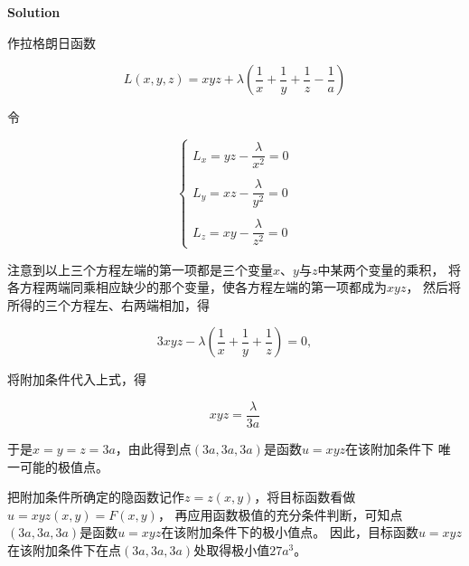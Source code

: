 \documentclass[12pt, a4paper]{article}
\numberwithin{equation}{section}
\begin{document}
    \textbf{Solution}
    \vspace{1em}

    作拉格朗日函数

    $$
        L(x, y, z)=x y z+\lambda\left(\frac{1}{x}+\frac{1}{y}+\frac{1}{z}-\frac{1}{a}\right)
    $$

    令

    $$
        \left\{\begin{array}{l}
            L_x=y z-\dfrac{\lambda}{x^2}=0 \\\\
            L_y=x z-\dfrac{\lambda}{y^2}=0 \\\\
            L_z=x y-\dfrac{\lambda}{z^2}=0
        \end{array}\right.
    $$

    注意到以上三个方程左端的第一项都是三个变量\(x\)、\(y \)与\(z\)中某两个变量的乘积，
    将各方程两端同乘相应缺少的那个变量，使各方程左端的第一项都成为\(xyz\)，
    然后将所得的三个方程左、右两端相加，得

    $$
        3 x y z-\lambda\left(\frac{1}{x}+\frac{1}{y}+\frac{1}{z}\right)=0,
    $$

    将附加条件代入上式，得

    $$
        x y z=\frac{\lambda}{3 a}
    $$

    于是\(x=y=z=3a\)，由此得到点\(\left(3a,3a,3a\right)\)是函数\(u=xyz\)在该附加条件下
    唯一可能的极值点。

    把附加条件所确定的隐函数记作\(z=z\left(x,y\right)\)，将目标函数看做\(u=xyz\left(x,y \right)=F\left(x,y \right)\)，
    再应用函数极值的充分条件判断，可知点\(\left(3a ,3a, 3a\right)\)是函数\(u =xyz\)在该附加条件下的极小值点。 
    因此，目标函数\(u=xyz\)在该附加条件下在点\(\left(3a ,3a, 3a\right)\)处取得极小值\(27a^3\)。
\end{document}
